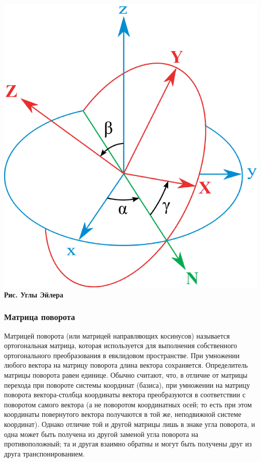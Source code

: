\begin{center}
\includegraphics[scale=0.25]{./Rigidbody/Eulerangles.eps}  \\
\textbf{Рис. Углы Эйлера}
\end{center}

\subsubsection{Матрица поворота}
Матрицей поворота (или матрицей направляющих косинусов) называется ортогональная матрица,
которая используется для выполнения собственного ортогонального преобразования в евклидовом пространстве.
При умножении любого вектора на матрицу поворота длина вектора сохраняется. Определитель матрицы поворота равен единице.
Обычно считают, что, в отличие от матрицы перехода при повороте системы координат (базиса),
при умножении на матрицу поворота вектора-столбца координаты вектора преобразуются в соответствии с поворотом
самого вектора (а не поворотом координатных осей; то есть при этом координаты повернутого вектора получаются в той же,
неподвижной системе координат). Однако отличие той и другой матрицы лишь в знаке угла поворота,
и одна может быть получена из другой заменой угла поворота на противоположный; та и другая взаимно обратны и могут быть получены
друг из друга транспонированием.

